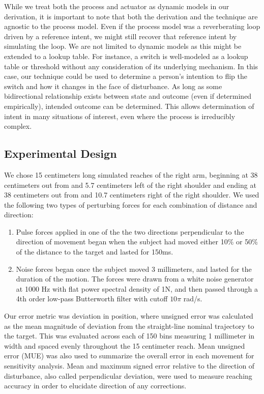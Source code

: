 While we treat both the process and actuator as dynamic models in our derivation, it is important to note that both the derivation and the technique are agnostic to the process model. Even if the process model was a reverberating loop \cite{fortney2012computational} driven by a reference intent, we might still recover that reference intent by simulating the loop. We are not limited to dynamic models as this might be extended to a lookup table. For instance, a switch is well-modeled as a lookup table or threshold without any consideration of its underlying mechanism. In this case, our technique could be used to determine a person's intention to flip the switch and how it changes in the face of disturbance. As long as some bidirectional relationship  exists between state and outcome (even if determined empirically), intended outcome can be determined. This allows determination of intent in many situations of interest, even where the process is irreducibly complex.

\subsection*{Experimental Design}
We chose 15 centimeters long simulated reaches of the right arm, beginning at 38 centimeters out from and 5.7 centimeters left of the right shoulder and ending at 38 centimeters out from and 10.7 centimeters right of the right shoulder.  We used the following two types of perturbing forces for each combination of distance and direction: 
\begin{enumerate}
\item Pulse forces applied in one of the the two directions perpendicular to the direction of movement began when the subject had moved either 10\% or 50\% of the distance to the target and lasted for 150ms.
\item Noise forces began once the subject moved 3 millimeters, and lasted for the duration of the motion. The forces were drawn from a white noise generator at 1000 Hz with flat power spectral density of 1N, and then passed through a 4th order low-pass Butterworth filter with cutoff $10 \pi$ rad/s.
\end{enumerate}
Our error metric was deviation in position, where unsigned error was calculated as the mean magnitude of deviation from the straight-line nominal trajectory to the target. This was evaluated across each of 150 bins measuring 1 millimeter in width and spaced evenly throughout the 15 centimeter reach. Mean unsigned error (MUE) was also used to summarize the overall error in each movement for sensitivity analysis. Mean and maximum signed error relative to the direction of disturbance, also called perpendicular deviation, were used to measure reaching accuracy in order to elucidate direction of any corrections.

